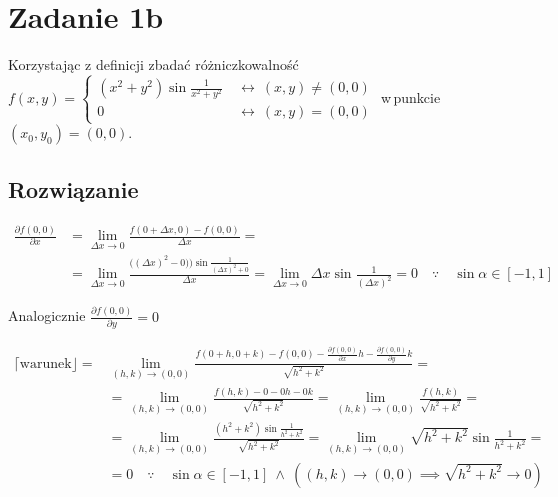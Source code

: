 \documentclass{article}
\newcommand{\for}{\ \leftrightarrow\ }
\newcommand{\partderiv}[2]{\frac{\partial #1}{\partial #2}}
\DeclareMathOperator{\?}{?}
\begin{document}
\section*{Zadanie 1b}
Korzystając z definicji zbadać różniczkowalność
$\displaystyle f(x,y) = \left\{ \begin{array}{ll}
   (x^2 + y^2) \sin \displaystyle \frac{1}{x^2 + y^2} & \for (x,y) \ne (0,0) \\
   0                                    & \for (x,y) =   (0,0)
\end{array}\right. $ w\,punkcie $(x_0, y_0) = (0,0)$.

\subsection*{Rozwiązanie}

\begin{equation*}
   \begin{aligned}
      \frac{\partial f(0,0)}{\partial x} &= \lim_{\Delta{x} \to 0} \frac{f(0+\Delta{x},0) - f(0,0)}{\Delta{x}} =\\
      &= \lim_{\Delta{x} \to 0} \frac{\Big((\Delta{x})^2 - 0)\Big) \sin{\frac{1}{(\Delta{x})^2 + 0}} }{\Delta{x}} =
      \lim_{\Delta{x} \to 0} \Delta{x} \sin{\frac{1}{(\Delta{x})^2}} = 0 \quad\because\quad \sin{\alpha} \in [-1,1]
   \end{aligned}
\end{equation*}

\vspace{1.5em}
Analogicznie $\displaystyle \partderiv{f(0,0)}{y} = 0 $

\begin{equation*}
   \begin{aligned}
      \lceil\mathrm{warunek}\rfloor = & \lim_{(h,k) \to (0,0)} \frac{
         \displaystyle f(0+h,0+k) - f(0,0) - \partderiv{f(0,0)}{x}h - \partderiv{f(0,0)}{y}k
      }{\sqrt{h^2 + k^2}} = \\[1em]
      &= \lim_{(h,k) \to (0,0)} \frac{ f(h,k) - 0 - 0h - 0k }{\sqrt{h^2 + k^2}} =
      \lim_{(h,k) \to (0,0)} \frac{ f(h,k)}{\sqrt{h^2 + k^2}} = \\[1em]
      &= \lim_{(h,k) \to (0,0)} \frac{ (h^2 + k^2) \sin \displaystyle \frac{1}{h^2 + k^2} }{\sqrt{h^2 + k^2}} =
      \lim_{(h,k) \to (0,0)} \sqrt{h^2 + k^2} \sin \displaystyle \frac{1}{h^2 + k^2} =\\[1em]
      &= 0 \quad\because\quad \sin{\alpha} \in [-1,1] \ \land \ \left( (h,k) \to (0,0) \implies \sqrt{h^2 + k^2} \to 0 \right)
   \end{aligned}
\end{equation*}
\end{document}
